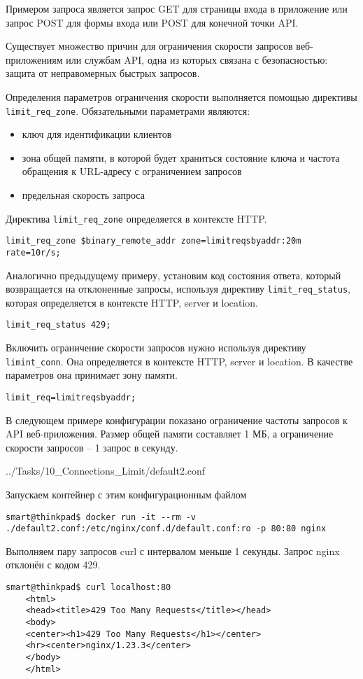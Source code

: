 Примером запроса является запрос GET для страницы входа в приложение или запрос POST для формы входа или POST для конечной точки API.

Существует множество причин для ограничения скорости запросов веб-приложениям или службам API, одна из которых связана с безопасностью: защита от неправомерных быстрых запросов.

Определения параметров ограничения скорости выполняется помощью директивы \texttt{limit\_req\_zone}. Обязательными параметрами являются:
\begin{itemize}
    \item ключ для идентификации клиентов
    \item зона общей памяти, в которой будет храниться состояние ключа и частота обращения к URL-адресу с ограничением запросов
    \item предельная скорость запроса
\end{itemize}

Директива \texttt{limit\_req\_zone} определяется в контексте HTTP.

\texttt{limit\_req\_zone \$binary\_remote\_addr zone=limitreqsbyaddr:20m rate=10r/s;}

Аналогично предыдущему примеру, установим код состояния ответа, который возвращается на отклоненные запросы, используя директиву \texttt{limit\_req\_status}, которая определяется в контексте HTTP, server и location.

\texttt{limit\_req\_status 429;}

Включить ограничение скорости запросов нужно используя директиву \texttt{limint\_conn}. Она определяется в контексте HTTP, server и location. В качестве параметров она принимает зону памяти.

\texttt{limit\_req=limitreqsbyaddr;}

В следующем примере конфигурации показано ограничение частоты запросов к API веб-приложения. Размер общей памяти составляет 1 МБ, а ограничение скорости запросов -- 1 запрос в секунду.

{../Tasks/10_Connections_Limit/default2.conf}

Запускаем контейнер с этим конфигурационным файлом
\begin{Verbatim}[frame=single,breaklines=true,breakanywhere=true]
    smart@thinkpad$ docker run -it --rm -v ./default2.conf:/etc/nginx/conf.d/default.conf:ro -p 80:80 nginx
\end{Verbatim}

Выполняем пару запросов curl с интервалом меньше 1 секунды. Запрос nginx отклонён с кодом 429.
\begin{Verbatim}[frame=single,breaklines=true,breakanywhere=true]
    smart@thinkpad$ curl localhost:80
    <html>
    <head><title>429 Too Many Requests</title></head>
    <body>
    <center><h1>429 Too Many Requests</h1></center>
    <hr><center>nginx/1.23.3</center>
    </body>
    </html>
\end{Verbatim}

